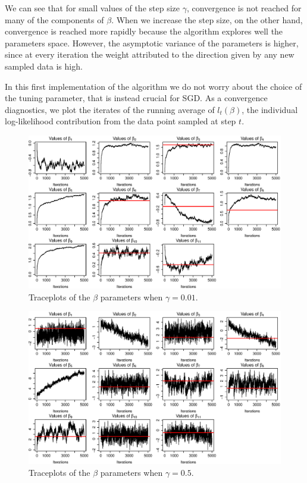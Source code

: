 \documentclass{homework}
\begin{document}
\begin{enumerate}[label=(\Alph*)]
We can see that for small values of the step size $\gamma$, convergence is not reached for many of the components of $\beta$. When we increase the step size, on the other hand, convergence is reached more rapidly because the algorithm explores well the parameters space. However, the asymptotic variance of the parameters is higher, since at every iteration the weight attributed to the direction given by any new sampled data is high. 

In this first implementation of the algorithm we do not worry about the choice of the tuning parameter, that is instead crucial for SGD. As a convergence diagnostics, we plot the iterates of the running average of $l_t(\beta)$, the individual log-likelihood contribution from the data point sampled at step $t$.

\begin{figure}[!ht]
\centering
\includegraphics[width=0.9\columnwidth]{./Img/a001}
\caption{Traceplots of the $\beta$ parameters when $\gamma = 0.01.$}
\label{fig:a001}
\end{figure}

\begin{figure}[!ht]
\centering
\includegraphics[width=0.9\columnwidth]{./Img/a05}
\caption{Traceplots of the $\beta$ parameters when $\gamma = 0.5.$}
\label{fig:a05}
\end{figure}


\end{enumerate}
\end{document}

